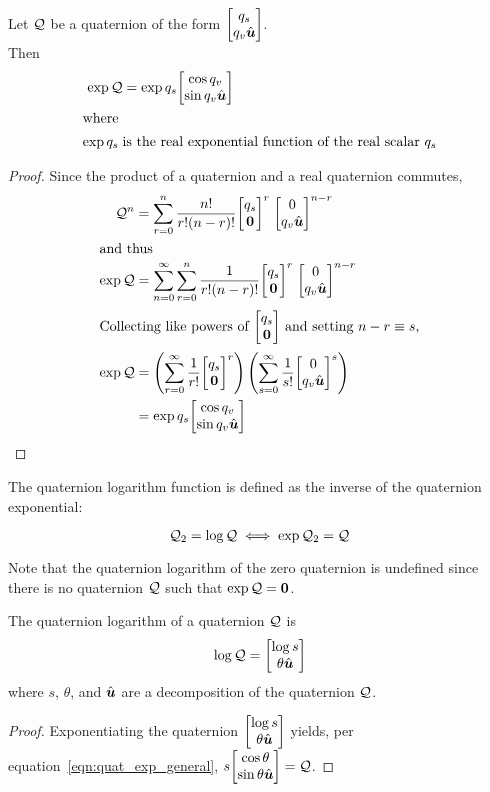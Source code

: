 \begin{corollary}\label{thm:quat_exp}
Let $\mathcal{Q}$ be a quaternion of the form $\quatsv {q_s} {q_v \vhat u}$. \\
Then
\begin{align}
  \exp \quat Q &=
    \exp q_s \quatsv {\cos q_v} {\sin q_v \vhat u}
  \label{eqn:quat_exp_general} \\
\intertext{where}
  \exp q_s\;&\text{is the real exponential function of the real scalar $q_s$}
  \nonumber
\end{align}
\end{corollary}
\begin{proof}
Since the product of a quaternion and a real quaternion commutes,
\begin{align*}
  \quat Q^{n} &=
    \sum_{r=0}^n
      \frac{n!}{r!(n-r)!}
      \quatsv {q_s} {\vect 0}^r \; \quatsv {0} {q_v \vhat u}^{n-r} \\
\intertext{and thus}
  \exp \quat Q &=
    \sum_{n=0}^\infty \sum_{r=0}^n
      \frac1{r!(n-r)!}
      \quatsv {q_s} {\vect 0}^r \; \quatsv {0} {q_v \vhat u}^{n-r} \\
\intertext{Collecting like powers of $\quatsv {q_s} {\vect 0}$ %
           and setting $n-r\equiv s$,}
  \exp \quat Q &=
      \left(\sum_{r=0}^\infty \frac1{r!} \quatsv {q_s} {\vect 0} ^r\right)
      \left(\sum_{s=0}^\infty \frac1{s!} \quatsv {0} {q_v \vhat u} ^s\right) \\
    &= \exp q_s \quatsv {\cos q_v} {\sin q_v \vhat u}
\end{align*}
\end{proof}

The quaternion logarithm function is defined as the inverse of the
quaternion exponential:
\begin{definition}\label{def:quat_log}
\begin{equation*}
  \mathcal{Q}_2 = \log \mathcal{Q} \iff \exp \mathcal{Q}_2 = \mathcal{Q}
\end{equation*}
\end{definition}
Note that the quaternion logarithm of the zero quaternion is undefined
since there is no quaternion $\mathcal{Q}$ such that $\exp \mathcal{Q} = \boldsymbol{0}$.

\begin{theorem}\label{thm:quat_log}
The quaternion logarithm of a quaternion $\mathcal{Q}$ is
\begin{equation}
  \log \quat Q = \quatsv{\log s}{\theta \vhat u} \label{eqn:quat_log_def}
\end{equation}
where $s$, $\theta$, and $\hat{\boldsymbol{u}}$ are a decomposition of the quaternion $\mathcal{Q}$.
\end{theorem}
\begin{proof}
Exponentiating the quaternion $\quatsv{\log s}{\theta \vhat u}$ yields,
per equation~\eqref{eqn:quat_exp_general},
$s \quatsv {\cos \theta} {\sin \theta \vhat u} = \quat Q$.
\end{proof}


